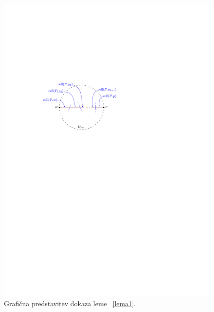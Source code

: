 \documentclass[a4paper, 12pt]{book}
\begin{document}
\begin{figure}
\centerline{\includegraphics[scale=1]{pics/path.pdf}}
\caption{Grafična predstavitev dokaza leme ~\ref{lema1}.}
\label{c1c2}
\end{figure}
\end{document}

